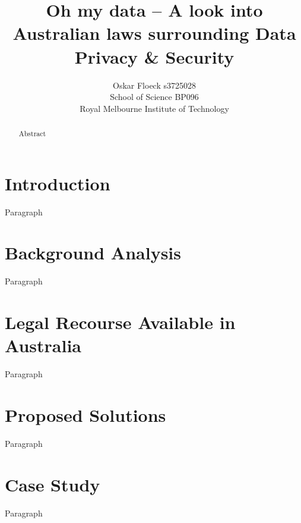 \documentclass[12pt,a4paper]{article}
\begin{document}
\title{Oh my data – A look into Australian laws surrounding Data Privacy \& Security}

\author{
Oskar Floeck s3725028\\
School of Science BP096\\
Royal Melbourne Institute of Technology}

\maketitle

\begin{abstract}
Abstract
\end{abstract}

\section{Introduction}

Paragraph

\section{Background Analysis}

Paragraph

\section{Legal Recourse Available in Australia}

Paragraph

\section{Proposed Solutions}

Paragraph

\section{Case Study}

Paragraph
\end{document}
